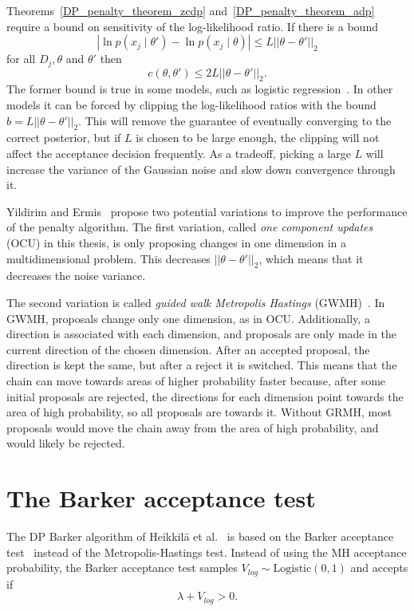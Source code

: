 \documentclass[english,twoside,openright]{HYgraduMLDS}
\begin{document}
Theorems~\ref{DP_penalty_theorem_zcdp} and~\ref{DP_penalty_theorem_adp}
require a bound on sensitivity of the log-likelihood ratio. If there is a bound
\[
    |\ln p(x_j\mid \theta') - \ln p(x_j\mid \theta)| \leq L||\theta - \theta'||_2
\]
for all \(D_j, \theta\) and \(\theta'\) then 
\[
    c(\theta, \theta') \leq 2L||\theta - \theta'||_2.
\]
The former bound is true in some models, such as logistic
regression~\cite{YildirimE19}. In other
models it can be forced by clipping the log-likelihood ratios with the bound
\(b = L||\theta - \theta'||_{2}\). This will remove the
guarantee of eventually converging to the correct posterior, but if \(L\) is 
chosen to be large enough, the clipping will not affect the 
acceptance decision frequently. As a tradeoff, picking a large \(L\) will increase 
the variance of the Gaussian noise and slow down convergence through it.

Yildirim and Ermis~\cite{YildirimE19} propose two potential variations to improve the
performance of the penalty algorithm. The first variation, called
\emph{one component updates} (OCU) in this thesis, is only proposing
changes in one dimension in a multidimensional problem. This decreases 
\(||\theta - \theta'||_2\), which means that it decreases the noise variance.

The second variation is called \emph{guided walk Metropolis Hastings}
(GWMH)~\cite{YildirimE19}.
In GWMH, proposals change only one dimension, as in OCU. Additionally, a direction
is associated with each dimension, and proposals are only made in the current
direction of the chosen dimension. After an accepted proposal, the direction is 
kept the same, but after a reject it is switched. This means that the chain can
move towards areas of higher probability faster because, after some initial 
proposals are rejected, the directions for each dimension point towards the 
area of high probability, so all proposals are towards it. Without GRMH, most
proposals would move the chain away from the area of high probability, and 
would likely be rejected.

\section{The Barker acceptance test}\label{dp_barker_section}

The DP Barker algorithm of Heikkilä et al.~\cite{HeikkilaJDH19} is based on
the Barker acceptance test~\cite{Barker65} instead of the Metropolis-Hastings test.
Instead of using the MH acceptance probability, the Barker acceptance test samples 
\(V_{log}\sim \mathrm{Logistic(0, 1)}\) and accepts if 
\[
    \lambda + V_{log} > 0.
\]
\end{document}
